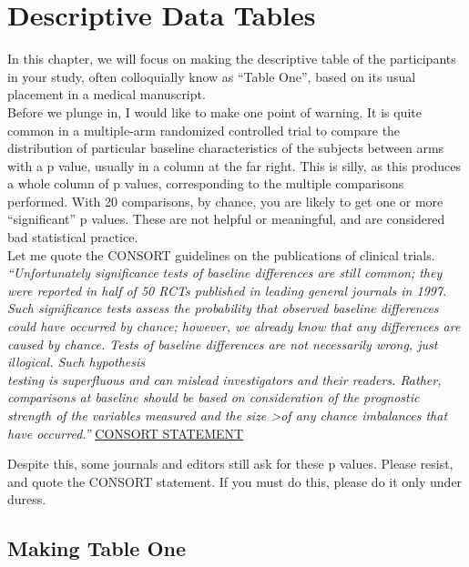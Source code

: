\documentclass[
]{book}
\begin{document}
\hypertarget{descriptive-data-tables}{%
\chapter{Descriptive Data Tables}\label{descriptive-data-tables}}

In this chapter, we will focus on making the descriptive table of the participants in your study, often colloquially know as ``Table One'', based on its usual placement in a medical manuscript.\\
Before we plunge in, I would like to make one point of warning. It is quite common in a multiple-arm randomized controlled trial to compare the distribution of particular baseline characteristics of the subjects between arms with a p value, usually in a column at the far right. This is silly, as this produces a whole column of p values, corresponding to the multiple comparisons performed. With 20 comparisons, by chance, you are likely to get one or more ``significant'' p values. These are not helpful or meaningful, and are considered bad statistical practice.\\
Let me quote the CONSORT guidelines on the publications of clinical trials.
\emph{``Unfortunately significance tests of baseline differences are still common; they were reported in half of 50 RCTs published in leading general journals in 1997. Such significance tests assess the probability that observed baseline differences could have occurred by chance; however, we already know that any differences are caused by chance. Tests of baseline differences are not necessarily wrong, just illogical. Such hypothesis\\
testing is superfluous and can mislead investigators and their readers. Rather, comparisons at baseline should be based on consideration of the prognostic strength of the variables measured and the size \textgreater of any chance imbalances that have occurred.''} \href{http://www.consort-statement.org/checklists/view/32-consort/510-\%3Ebaseline-data}{CONSORT STATEMENT}

Despite this, some journals and editors still ask for these p values. Please resist, and quote the CONSORT statement. If you must do this, please do it only under duress.

\hypertarget{making-table-one}{%
\section{Making Table One}\label{making-table-one}}
\end{document}
